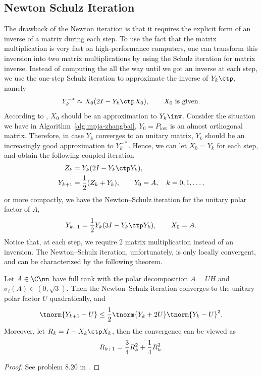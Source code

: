 \documentclass{article}
\numberwithin{equation}{section} %
\begin{document}
\subsection{Newton Schulz Iteration}
\label{sec.newt-schulz-iter}
The drawback of the Newton iteration is that it requires the explicit form
of an inverse of a matrix during each step.
To use the fact that the matrix multiplication is very fast on
high-performance computers, one can transform this inversion into two matrix
multiplications by using the Schulz iteration for matrix inverse.
Instead of computing the all the way until we got an inverse
at each step, we use the one-step Schulz iteration to approximate the
inverse of $Y_{k}\ctp$, namely
\begin{equation}\notag
  Y_{k}^{-*} \approx X_{0}(2I - Y_{k}\ctp X_{0}), \qquad
  \text{$X_{0}$ is given.}
\end{equation}
According to , $X_{0}$ should be an approximation to
$Y_{k}\inv$.
Consider the situation we have in Algorithm~\ref{alg.mpja-zhangbai},  
$Y_{0} = P_{\mathrm{low}}$ is an almost orthogonal matrix.
Therefore, in case $Y_{k}$ converges to an unitary matrix, $Y_{k}$
should be an increasingly good approximation to $Y_{k}^{-*}$.
Hence, we can let $X_{0} = Y_{k}$ for each step, and obtain the
following coupled iteration 
\begin{equation}\notag
  \begin{aligned}
    Z_{k} & = Y_{k} (2I- Y_{k}\ctp Y_{k}),\\
    Y_{k+1} & = \frac{1}{2}(Z_{k} + Y_{k}),
              \qquad Y_{0} = A, \quad k = 0,1,\dots,
  \end{aligned}
\end{equation}
or more compactly, we have the Newton--Schulz iteration for the unitary
polar factor of $A$,
\begin{equation}\notag
  Y_{k+1} = \frac{1}{2}Y_{k}(3I - Y_{k}\ctp Y_{k}),\qquad X_{0} = A.
\end{equation}
Notice that, at each step, we require 2 matrix multiplication instead of an
inversion. The Newton--Schulz iteration, unfortunately, is only locally
convergent, and can be characterized by the following theorem.

\begin{theorem}
\label{thm.conv-newton-schulz}
Let $A\in\C\nn$ have full rank with the polar decomposition $A = UH$ and
$\sigma_{i}(A) \in (0,\sqrt{3})$. Then the Newton--Schulz iteration
converges to the unitary polar factor $U$ quadratically, and
\begin{equation}\notag
  \tnorm{Y_{k+1} - U} \le \frac{1}{2}\tnorm{Y_{k} + 2U}\tnorm{Y_{k}-U}^{2}.
\end{equation}
Moreover, let $R_{k} = I - X_{k}\ctp X_{k}$, then the convergence can be
viewed as
\begin{equation}\notag
  R_{k+1} = \frac{3}{4} R_{k}^{2} + \frac{1}{4} R_{k}^{3}.
\end{equation}
\end{theorem}
\begin{proof}
See problem 8.20 in .
\end{proof}
\end{document}
